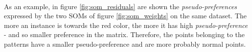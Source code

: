 \paragraph{}
As an example, in figure \ref{fig:som_residuals} are shown the \textit{pseudo-preferences} expressed by the two SOMs of figure \ref{fig:som_weights} on the same dataset. The more an instance is towards the red color, the more it has high \textit{pseudo-preference} - and so smaller preference in the matrix. Therefore, the points belonging to the patterns have a smaller pseudo-preference and are more probably normal points.
